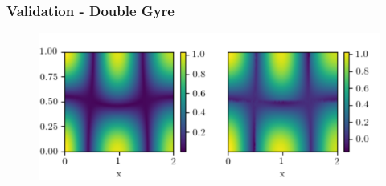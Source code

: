 \documentclass[../presentation.tex]{subfiles}
\begin{document}
\begin{frame}
  \frametitle{Validation - Double Gyre}

  \begin{figure}[H]
    \centering
    \includegraphics[width=\linewidth]{images/figure6.png}
  \end{figure}
\end{frame}
\end{document}
